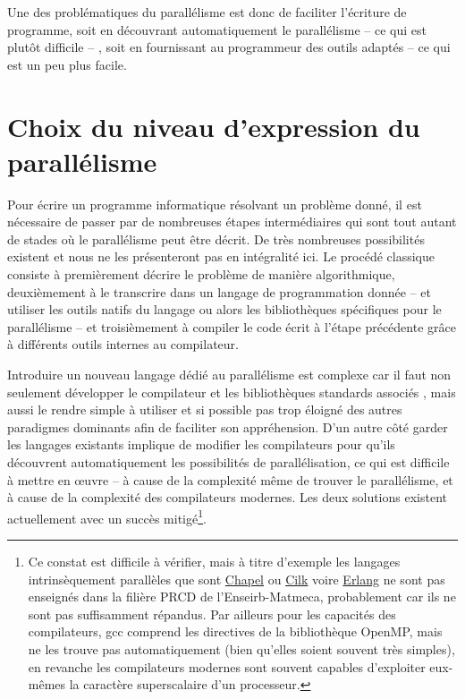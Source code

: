 Une des problématiques du parallélisme est donc de faciliter l'écriture de programme, soit en découvrant automatiquement le parallélisme -- ce qui est plutôt difficile -- , soit en fournissant au programmeur des outils adaptés -- ce qui est un peu plus facile.

\section{Choix du niveau d'expression du parallélisme}

Pour écrire un programme informatique résolvant un problème donné, il est nécessaire de passer par de nombreuses étapes intermédiaires qui sont tout autant de stades où le parallélisme peut être décrit. De très nombreuses possibilités existent et nous ne les présenteront pas en intégralité ici. Le procédé classique consiste à premièrement décrire le problème de manière algorithmique, deuxièmement à le transcrire dans un langage de programmation donnée -- et utiliser les outils natifs du langage ou alors les bibliothèques spécifiques pour le parallélisme -- et troisièmement à compiler le code écrit à l'étape précédente grâce à différents outils internes au compilateur.  

Introduire un nouveau langage dédié au parallélisme est complexe car il faut non seulement développer le compilateur et les bibliothèques standards associés , mais aussi le rendre simple à utiliser et si possible pas trop éloigné des autres paradigmes dominants afin de faciliter son appréhension. D'un autre côté garder les langages existants implique de modifier les compilateurs pour qu'ils découvrent automatiquement les possibilités de parallélisation, ce qui est difficile à mettre en œuvre -- à cause de la complexité même de trouver le parallélisme, et à cause de la complexité des compilateurs modernes. Les deux solutions existent actuellement avec un succès mitigé\footnote{Ce constat est difficile à vérifier, mais à titre d'exemple les langages intrinsèquement parallèles que sont \textsf{\href{http://chapel.cray.com/}{Chapel}} ou \textsf{\href{https://www.cilkplus.org/}{Cilk}} voire \textsf{\href{http://www.erlang.org/}{Erlang}} ne sont pas enseignés dans la filière PRCD de l'Enseirb-Matmeca, probablement car ils ne sont pas suffisamment répandus. Par ailleurs pour les capacités des compilateurs, \textsf{gcc} comprend les directives de la bibliothèque OpenMP, mais ne les trouve pas automatiquement (bien qu'elles soient souvent très simples), en revanche les compilateurs modernes sont souvent capables d'exploiter eux-mêmes la caractère superscalaire d'un processeur.}.

